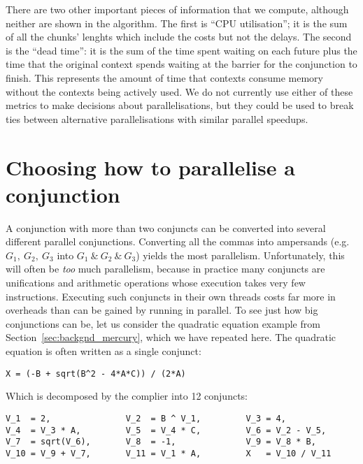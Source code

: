 There are two other important pieces of information that we compute,
although neither are shown in the algorithm.
The first is ``CPU utilisation'';
it is the sum of all the chunks' lenghts which include the costs but not the
delays.
The second is the ``dead time'':
it is the sum of the time spent waiting on each future plus the time that
the original context spends waiting at the barrier for the conjunction to
finish.
This represents the amount of time that contexts consume memory without
the contexts being actively used.
We do not currently use either of these metrics to make decisions about
parallelisations,
but they could be used to break ties between alternative parallelisations
with similar parallel speedups.


\section{Choosing how to parallelise a conjunction}
\label{sec:overlap_howto}


A conjunction with more than two conjuncts can be converted into several
different parallel conjunctions.
Converting all the commas into ampersands
(e.g.\ $G_1,~G_2,~G_3$ into $G_1~\&~G_2~\&~G_3$)
yields the most parallelism.
Unfortunately, this will often be \emph{too} much parallelism,
because in practice many conjuncts are unifications
and arithmetic operations whose execution takes very few instructions.
Executing such conjuncts in their own threads
costs far more in overheads than can be gained by running in parallel.
To see just how big conjunctions can be,
let us consider the quadratic equation example
from Section~\ref{sec:backgnd_mercury},
which we have repeated here.
The quadratic equation is often written as a single conjunct:

\begin{verbatim}
X = (-B + sqrt(B^2 - 4*A*C)) / (2*A)
\end{verbatim}

\noindent
Which is decomposed by the complier into 12 conjuncts:

\begin{verbatim}
V_1  = 2,               V_2  = B ^ V_1,         V_3 = 4,
V_4  = V_3 * A,         V_5  = V_4 * C,         V_6 = V_2 - V_5,
V_7  = sqrt(V_6),       V_8  = -1,              V_9 = V_8 * B,
V_10 = V_9 + V_7,       V_11 = V_1 * A,         X   = V_10 / V_11
\end{verbatim}

